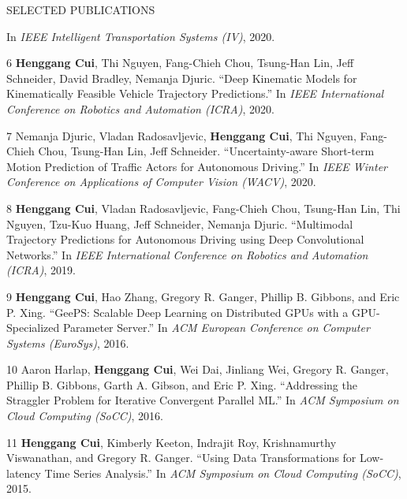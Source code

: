 \documentclass{resume} %
\begin{document}
\begin{rSection}{SELECTED PUBLICATIONS}
{        In \emph{IEEE Intelligent Transportation Systems (IV)}, 2020.
    \item
    [6]
        {\bf Henggang Cui}, Thi Nguyen, Fang-Chieh Chou, Tsung-Han Lin, Jeff Schneider, David Bradley, Nemanja Djuric.
        ``Deep Kinematic Models for Kinematically Feasible Vehicle Trajectory Predictions.''
        In \emph{IEEE International Conference on Robotics and Automation (ICRA)}, 2020.
    \item
    [7]
        Nemanja Djuric, Vladan Radosavljevic, {\bf Henggang Cui}, Thi Nguyen, Fang-Chieh Chou, Tsung-Han Lin, Jeff Schneider.
        ``Uncertainty-aware Short-term Motion Prediction of Traffic Actors for Autonomous Driving.''
        In \emph{IEEE Winter Conference on Applications of Computer Vision (WACV)}, 2020.
    \item
    [8]
        {\bf Henggang Cui}, Vladan Radosavljevic, Fang-Chieh Chou, Tsung-Han Lin, Thi Nguyen, Tzu-Kuo Huang, Jeff Schneider, Nemanja Djuric.
        ``Multimodal Trajectory Predictions for Autonomous Driving using Deep Convolutional Networks.''
        In \emph{IEEE International Conference on Robotics and Automation (ICRA)}, 2019.
    \item
    [9]
        {\bf Henggang Cui}, Hao Zhang, Gregory R. Ganger, Phillip B. Gibbons, and Eric P. Xing.
        ``GeePS: Scalable Deep Learning on Distributed GPUs with a GPU-Specialized Parameter Server.''
        In \emph{ACM European Conference on Computer Systems (EuroSys)}, 2016.
    \item
    [10]
        Aaron Harlap, {\bf Henggang Cui}, Wei Dai, Jinliang Wei, Gregory R. Ganger, Phillip B. Gibbons, Garth A. Gibson, and Eric P. Xing.
        ``Addressing the Straggler Problem for Iterative Convergent Parallel ML.''
        In \emph{ACM Symposium on Cloud Computing (SoCC)}, 2016.
    \item
    [11]
        {\bf Henggang Cui}, Kimberly Keeton, Indrajit Roy, Krishnamurthy Viswanathan, and Gregory R. Ganger.
        ``Using Data Transformations for Low-latency Time Series Analysis.''
        In \emph{ACM Symposium on Cloud Computing (SoCC)}, 2015.
}
\end{rSection}
\end{document}
